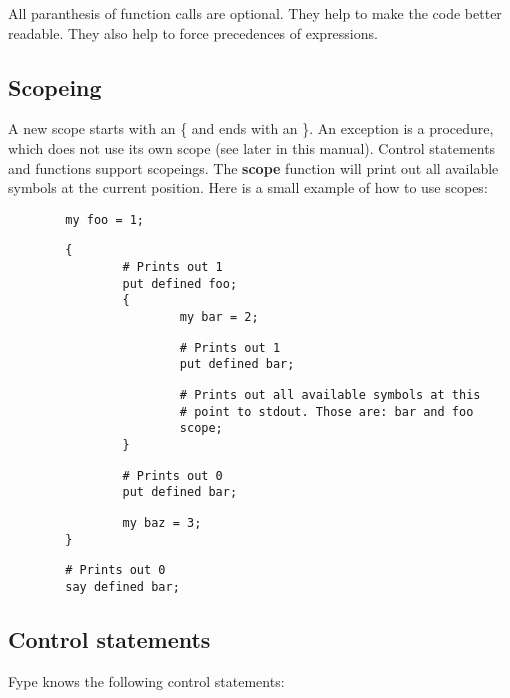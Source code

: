 All paranthesis of function calls are optional. They help to make the code better readable. They also help to force precedences of expressions.

\subsection*{Scopeing\label{Scopeing}}


A new scope starts with an \{ and ends with an \}. An exception is a procedure, which does not use its own scope (see later in this manual). Control statements and functions support scopeings.  The \textbf{scope} function will print out all available symbols at the current position. Here is a small example of how to use scopes:

\begin{verbatim}
        my foo = 1;
\end{verbatim}
\begin{verbatim}
        {
                # Prints out 1
                put defined foo;
                {
                        my bar = 2;
\end{verbatim}
\begin{verbatim}
                        # Prints out 1
                        put defined bar;
\end{verbatim}
\begin{verbatim}
                        # Prints out all available symbols at this
                        # point to stdout. Those are: bar and foo
                        scope;
                }
\end{verbatim}
\begin{verbatim}
                # Prints out 0
                put defined bar;
\end{verbatim}
\begin{verbatim}
                my baz = 3;
        }
\end{verbatim}
\begin{verbatim}
        # Prints out 0
        say defined bar;
\end{verbatim}
\subsection*{Control statements\label{Control_statements}}


Fype knows the following control statements:

